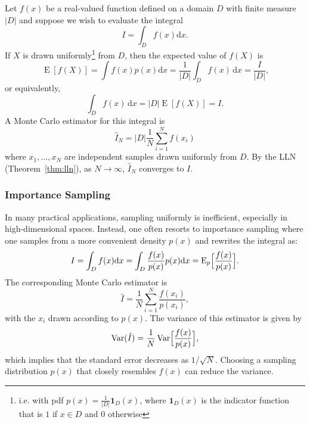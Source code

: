 \documentclass[10pt, headings=standardclasses, parskip=half, twoside]{scrartcl}
\renewcommand{\emph}[1]{\textcolor{mypurple}{#1}}
\newcommand{\dif}{\mathrm{d}}
\newcommand{\Var}{\operatorname{Var}}
\newcommand{\Exp}{\operatorname{E}}
\begin{document}
Let $f(x)$ be a real-valued function defined on a domain $D$ with finite measure \(|D|\) and suppose we wish to evaluate the integral
\[
I=\int_D f(x) \dif x \text{.}
\]
If $X$ is drawn uniformly\footnote{i.e. with pdf $p(x)=\frac{1}{|D|}\mathbf{1}_{D}(x)$, where $\mathbf{1}_{D}(x)$ is the indicator function that is $1$ if $x \in D$ and $0$ otherwise} from $D$, then the expected value of $f(X)$ is
\[
\operatorname{E}[f(X)]
=\int f(x) p(x) \dif x
=\frac{1}{|D|} \int_{D} f(x) \, \mathrm{d} x 
= \frac{I}{|D|} 
\text{,}
\]
or equivalently,
\[
\int_{D} f(x) \, \mathrm{d} x=|D| \operatorname{E}[f(X)] = I \text{.}
\]
%
A Monte Carlo estimator for this integral is
\[
\boxed{
  \hat{I}_{N}=|D| \frac{1}{N} \sum_{i=1}^{N} f\left(x_{i}\right)
}
\]
where $x_{1}, \ldots, x_{N}$ are independent samples drawn uniformly from $D$.
%
By the LLN (Theorem~\ref{thm:lln}), as \(N\to\infty\), \(\hat{I}_N\) converges to \(I\).



\subsubsection{Importance Sampling}

In many practical applications, sampling uniformly is inefficient, especially in high-dimensional spaces. 
Instead, one often resorts to \emph{importance sampling} where one samples from a more convenient density \(p(x)\) and rewrites the integral as:
\[
I=\int_D f(x)\dif x=\int_D \frac{f(x)}{p(x)}p(x)\dif x=\Exp_{p}\Bigl[\frac{f(x)}{p(x)}\Bigr].
\]
The corresponding Monte Carlo estimator is
\[
\hat{I}=\frac{1}{N}\sum_{i=1}^N \frac{f(x_i)}{p(x_i)},
\]
with the \(x_i\) drawn according to \(p(x)\). The variance of this estimator is given by
\[
\Var(\hat{I})=\frac{1}{N}\Var\Bigl[\frac{f(x)}{p(x)}\Bigr]\text{,}
\]
which implies that the standard error decreases as \(1/\sqrt{N}\).
Choosing a sampling distribution \(p(x)\) that closely resembles \(f(x)\) can reduce the variance.
\end{document}

